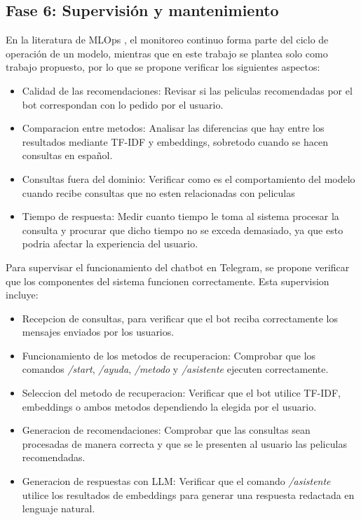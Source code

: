 ﻿\subsection{Fase 6: Supervisión y mantenimiento}
En la literatura de MLOps \cite{kreuzberger2023mlops}, el monitoreo continuo forma parte del ciclo de operación de un modelo, mientras que en este trabajo se plantea solo como trabajo propuesto, por lo que se propone verificar los siguientes aspectos:

\begin{itemize}
    \item Calidad de las recomendaciones: Revisar si las peliculas recomendadas por el bot correspondan con lo pedido por el usuario.
    \item Comparacion entre metodos: Analisar las diferencias que hay entre los resultados mediante TF-IDF y embeddings, sobretodo cuando se hacen consultas en español.
    \item Consultas fuera del dominio: Verificar como es el comportamiento del modelo cuando recibe consultas que no esten relacionadas con peliculas
    \item Tiempo de respuesta: Medir cuanto tiempo le toma al sistema procesar la consulta y procurar que dicho tiempo no se exceda demasiado, ya que esto podria afectar la experiencia del usuario.
\end{itemize}

Para supervisar el funcionamiento del chatbot en Telegram, se propone verificar que los componentes del sistema funcionen correctamente. Esta supervision incluye: 

\begin{itemize}
    \item Recepcion de consultas, para verificar que el bot reciba correctamente los mensajes enviados por los usuarios.
    \item Funcionamiento de los metodos de recuperacion: Comprobar que los comandos \textit{/start}, \textit{/ayuda}, \textit{/metodo} y \textit{/asistente} ejecuten correctamente.
    \item Seleccion del metodo de recuperacion: Verificar que el bot utilice TF-IDF, embeddings o ambos metodos dependiendo la elegida por el usuario.
    \item Generacion de recomendaciones: Comprobar que las consultas sean procesadas de manera correcta y que se le presenten al usuario las peliculas recomendadas.
    \item Generacion de respuestas con LLM: Verificar que el comando \textit{/asistente} utilice los resultados de embeddings para generar una respuesta redactada en lenguaje natural.  
\end{itemize}